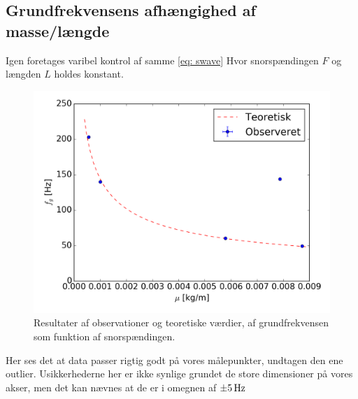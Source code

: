 \documentclass[A2_main.tex]{subfiles}
\begin{document}
\subsection{Grundfrekvensens afhængighed af masse/længde}
Igen foretages varibel kontrol af samme \cref{eq: swave} Hvor snorspændingen $F$ og længden $L$ holdes konstant.
\begin{figure}[H]
    \includegraphics[width=\linewidth]{frekvensMu.png}
    \caption{Resultater af observationer og teoretiske værdier, af grundfrekvensen som funktion af snorspændingen.}
    \label{fig:frekvensMu}
\end{figure}
Her ses det at data passer rigtig godt på vores målepunkter, undtagen den ene outlier. Usikkerhederne her er ikke synlige grundet de store dimensioner på vores akser, men det kan nævnes at de er i omegnen af $\SI{\pm 5}{\hertz}$
\end{document}
